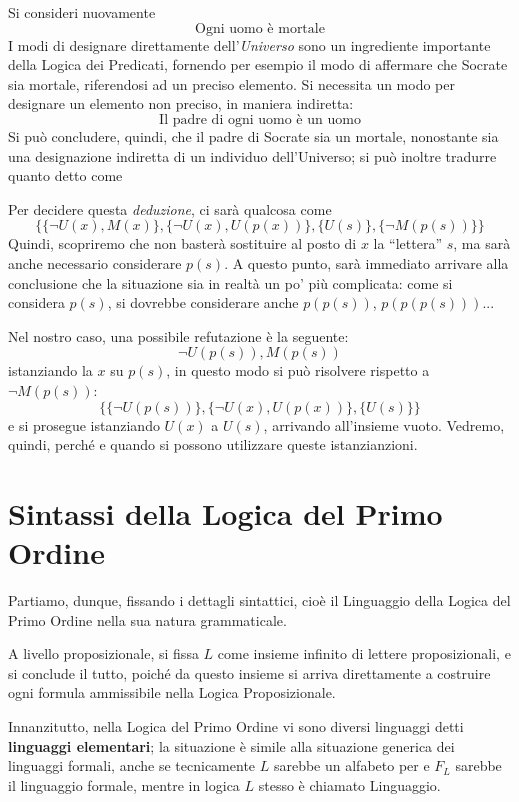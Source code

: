 Si consideri nuovamente 
$$
\text{ Ogni uomo è mortale }
$$
I modi di designare direttamente dell'\textit{Universo} sono un ingrediente 
importante della Logica dei Predicati, fornendo per esempio il modo di 
affermare che Socrate sia mortale, riferendosi ad un preciso elemento. 
Si necessita un modo per designare un elemento non preciso, in maniera indiretta: 
$$
\text{ Il padre di ogni uomo è un uomo }
$$
Si può concludere, quindi, che il padre di Socrate sia un mortale, 
nonostante sia una designazione indiretta di un individuo dell'Universo; 
si può inoltre tradurre quanto detto come 
\begin{prooftree}
\end{prooftree}

Per decidere questa \textit{deduzione}, ci sarà qualcosa come 
$$
\{\{\neg U(x), M(x)\}, \{\neg U(x), U(p(x))\}, \{U(s)\}, \{\neg M(p(s))\}\}
$$
Quindi, scopriremo che non basterà sostituire al posto di $x$ la ``lettera'' 
$s$, ma sarà anche necessario considerare $p(s)$. A questo punto, sarà immediato 
arrivare alla conclusione che la situazione sia in realtà un po' più complicata: 
come si considera $p(s)$, si dovrebbe considerare anche $p(p(s))$, $p(p(p(s)))$...

Nel nostro caso, una possibile refutazione è la seguente: 
$$
\neg U(p(s)), M(p(s))
$$
istanziando la $x$ su $p(s)$, in questo modo si può risolvere 
rispetto a $\neg M(p(s))$: 
$$
\{\{\neg U(p(s))\}, \{\neg U(x), U(p(x))\}, \{U(s)\}\}
$$
e si prosegue istanziando $U(x)$ a $U(s)$, arrivando all'insieme vuoto. 
Vedremo, quindi, perché e quando si possono utilizzare queste istanzianzioni. 

\section{Sintassi della Logica del Primo Ordine}
Partiamo, dunque, fissando i dettagli sintattici, cioè il Linguaggio 
della Logica del Primo Ordine nella sua natura grammaticale. 

A livello proposizionale, si fissa $L$ come insieme infinito di lettere 
proposizionali, e si conclude il tutto, poiché da questo insieme si arriva 
direttamente a costruire ogni formula ammissibile nella Logica Proposizionale.

Innanzitutto, nella Logica del Primo Ordine vi sono diversi linguaggi detti 
\textbf{linguaggi elementari}; la situazione è simile alla situazione generica 
dei linguaggi formali, anche se tecnicamente $L$ sarebbe un alfabeto per e $F_L$ 
sarebbe il linguaggio formale, mentre in logica $L$ stesso è chiamato Linguaggio. 

